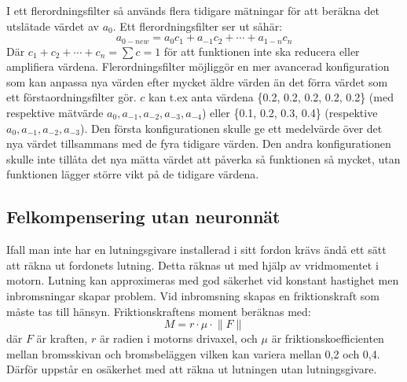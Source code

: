 I ett flerordningsfilter så används flera tidigare mätningar för att
beräkna det utslätade värdet av $a_{0}$. Ett flerordningsfilter ser ut såhär:
\begin{equation}
	a_{0-new} = a_{0}c_{1} + a_{-1}c_{2} + \dotsb + a_{1-n}c_{n}
\end{equation}
Där $ c_1 + c_2 + \dotsb + c_n = \sum c = 1 $ för att funktionen
inte ska reducera eller amplifiera värdena.
Flerordningsfilter möjliggör en mer avancerad konfiguration som kan anpassa
nya värden efter mycket äldre värden än det förra värdet som ett
förstaordningsfilter gör.
$c$ kan t.ex anta värdena \{0.2, 0.2, 0.2, 0.2, 0.2\} (med respektive mätvärde
$a_0, a_{-1}, a_{-2}, a_{-3}, a_{-4}$) eller \{0.1, 0.2, 0.3, 0.4\}
(respektive $ a_0, a_{-1}, a_{-2}, a_{-3}$).
Den första konfigurationen skulle ge ett medelvärde över det nya värdet
tillsammans med de fyra tidigare värden. Den andra konfigurationen skulle
inte tillåta det nya mätta värdet att påverka så funktionen så mycket,
utan funktionen lägger större vikt på de tidigare värdena.

\subsection{Felkompensering utan neuronnät}
Ifall man inte har en lutningsgivare installerad i sitt fordon krävs ändå ett
sätt att räkna ut fordonets lutning.
Detta räknas ut med hjälp av vridmomentet i motorn.
Lutning kan approximeras med god säkerhet vid konstant hastighet men inbromsningar
skapar problem.
Vid inbromsning skapas en friktionskraft som måste tas till hänsyn.
Friktionskraftens moment beräknas med:
\begin{equation}
	M = r \cdot \mu \cdot \lVert F \rVert
\end{equation}
där $F$ är kraften, $r$ är radien i motorns drivaxel, och $\mu$ är friktionskoefficienten
mellan bromsskivan och bromsbeläggen vilken kan variera mellan 0,2 och 0,4.
Därför uppstår en osäkerhet med att räkna ut lutningen utan lutningsgivare.
\autocite{lauri17}


